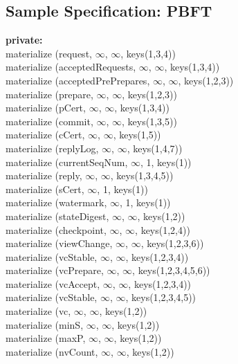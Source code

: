 \subsection{Sample Specification: PBFT}
\begin{code}
\textbf{private:}\\
\> materialize (request, $\infty$, $\infty$, keys(1,3,4))\\
\> materialize (acceptedRequests, $\infty$, $\infty$, keys(1,3,4))\\
\> materialize (acceptedPrePrepares, $\infty$, $\infty$, keys(1,2,3))\\
\> materialize (prepare, $\infty$, $\infty$, keys(1,2,3))\\
\> materialize (pCert, $\infty$, $\infty$, keys(1,3,4))\\
\> materialize (commit, $\infty$, $\infty$, keys(1,3,5))\\
\> materialize (cCert, $\infty$, $\infty$, keys(1,5))\\
\> materialize (replyLog, $\infty$, $\infty$, keys(1,4,7))\\
\> materialize (currentSeqNum, $\infty$, 1, keys(1))\\
\> materialize (reply, $\infty$, $\infty$, keys(1,3,4,5))\\
\> materialize (sCert, $\infty$, 1, keys(1))\\
\> materialize (watermark, $\infty$, 1, keys(1))\\
\> materialize (stateDigest, $\infty$, $\infty$, keys(1,2))\\
\> materialize (checkpoint, $\infty$, $\infty$, keys(1,2,4))\\
\> materialize (viewChange, $\infty$, $\infty$, keys(1,2,3,6))\\
\> materialize (vcStable, $\infty$, $\infty$, keys(1,2,3,4))\\
\> materialize (vcPrepare, $\infty$, $\infty$, keys(1,2,3,4,5,6))\\
\> materialize (vcAccept, $\infty$, $\infty$, keys(1,2,3,4))\\
\> materialize (vcStable, $\infty$, $\infty$, keys(1,2,3,4,5))\\
\> materialize (vc, $\infty$, $\infty$, keys(1,2))\\
\> materialize (minS, $\infty$, $\infty$, keys(1,2))\\
\> materialize (maxP, $\infty$, $\infty$, keys(1,2))\\
\> materialize (nvCount, $\infty$, $\infty$, keys(1,2))\\

\end{code}
